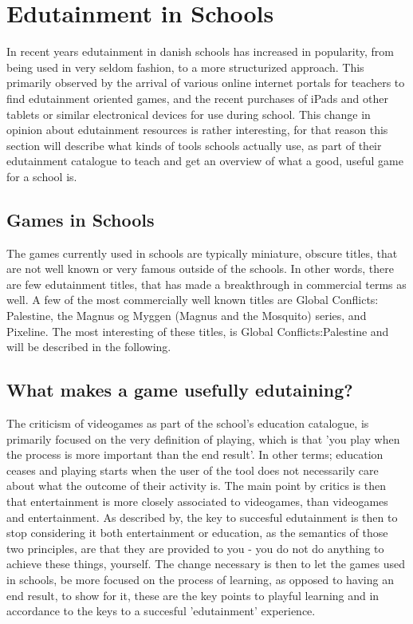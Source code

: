 \section{Edutainment in Schools}
\label{sec:eduinsch}
In recent years edutainment in danish schools has increased in popularity, from being used in very seldom fashion, to a more structurized approach. This primarily observed by the arrival of various online internet portals for teachers to find edutainment oriented games, and the recent purchases of iPads and other tablets or similar electronical devices for use during school. This change in opinion about edutainment resources is rather interesting, for that reason this section will describe what kinds of tools schools actually use, as part of their edutainment catalogue to teach and get an overview of what a good, useful game for a school is.


\subsection{Games in Schools}

The games currently used in schools are typically miniature, obscure titles, that are not well known or very famous outside of the schools. In other words, there are few edutainment titles, that has made a breakthrough in commercial terms as well. A few of the most commercially well known titles are Global Conflicts: Palestine, the Magnus og Myggen (Magnus and the Mosquito) series, and Pixeline. The most interesting of these titles, is Global Conflicts:Palestine and will be described in the following.


\subsection{What makes a game usefully edutaining?}

The criticism of videogames as part of the school's education catalogue, is primarily focused on the very definition of playing, which is that 'you play when the process is more important than the end result'. In other terms; education ceases and playing starts when the user of the tool does not necessarily care about what the outcome of their activity is. The main point by critics is then that entertainment is more closely associated to videogames, than videogames and entertainment. As described by\cite{edunoty}, the key to succesful edutainment is then to stop considering it both entertainment or education, as the semantics of those two principles, are that they are provided to you - you do not do anything to achieve these things, yourself. The change necessary is then to let the games used in schools, be more focused on the process of learning, as opposed to having an end result, to show for it, these are the key points to playful learning and in accordance to \cite{edunoty} the keys to a succesful 'edutainment' experience.

